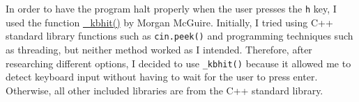 \documentclass{article}
\begin{document}
In order to have the program halt properly when the user presses the \texttt{h} key, I used the function \href{https://www.flipcode.com/archives/\_kbhit\_for\_Linux.shtml}{\_kbhit()} by Morgan McGuire.
Initially, I tried using C++ standard library functions such as \texttt{cin.peek()} and programming techniques such as threading, but neither method worked as I intended.
Therefore, after researching different options, I decided to use \texttt{\_kbhit()} because it allowed me to detect keyboard input without having to wait for the user to press enter.
Otherwise, all other included libraries are from the C++ standard library.
\end{document}
